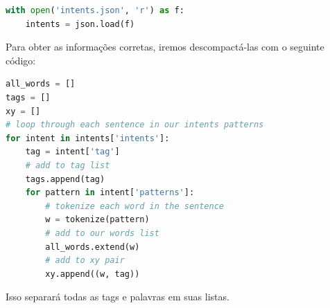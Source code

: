 \begin{lstlisting}[language=Python, caption=Python Carregando dados]
with open('intents.json', 'r') as f:
    intents = json.load(f)
\end{lstlisting}

Para obter as informações corretas, iremos descompactá-las com o seguinte código:

\begin{lstlisting}[language=Python, caption=Python Loop nos dados]
all_words = []
tags = []
xy = []
# loop through each sentence in our intents patterns
for intent in intents['intents']:
    tag = intent['tag']
    # add to tag list
    tags.append(tag)
    for pattern in intent['patterns']:
        # tokenize each word in the sentence
        w = tokenize(pattern)
        # add to our words list
        all_words.extend(w)
        # add to xy pair
        xy.append((w, tag))

\end{lstlisting}
Isso separará todas as tags e palavras em suas listas.
